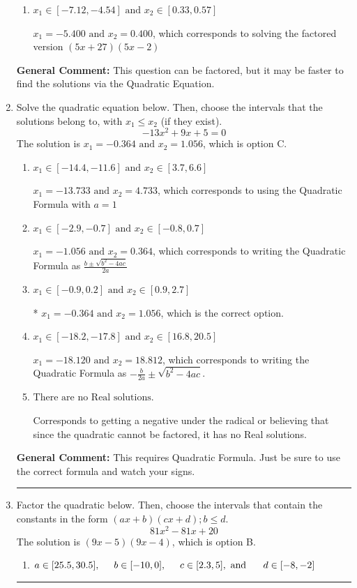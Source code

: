 \documentclass{extbook}[14pt]
\newcommand{\litem}[1]{\item #1

\rule{\textwidth}{0.4pt}}
\begin{document}
\begin{enumerate}
{\begin{enumerate}[label=\Alph*.]
$x_1 = -45.000 \text{ and } x_2 = 30.000$, which corresponds to solving the factored version $(x + 45)(x -30)$
\item \( x_1 \in [-7.12, -4.54] \text{ and } x_2 \in [0.33, 0.57] \)

$x_1 = -5.400 \text{ and } x_2 = 0.400$, which corresponds to solving the factored version $(5x + 27)(5x -2)$
\end{enumerate}

\textbf{General Comment:} This question can be factored, but it may be faster to find the solutions via the Quadratic Equation.
}
\litem{
Solve the quadratic equation below. Then, choose the intervals that the solutions belong to, with $x_1 \leq x_2$ (if they exist).
\[ -13x^{2} +9 x + 5 = 0 \]The solution is \( x_1 = -0.364 \text{ and } x_2 = 1.056 \), which is option C.\begin{enumerate}[label=\Alph*.]
\item \( x_1 \in [-14.4, -11.6] \text{ and } x_2 \in [3.7, 6.6] \)

 $x_1 = -13.733 \text{ and } x_2 = 4.733$, which corresponds to using the Quadratic Formula with $a=1$
\item \( x_1 \in [-2.9, -0.7] \text{ and } x_2 \in [-0.8, 0.7] \)

 $x_1 = -1.056 \text{ and } x_2 = 0.364$, which corresponds to writing the Quadratic Formula as $\frac{b \pm \sqrt{b^2 - 4ac}}{2a}$
\item \( x_1 \in [-0.9, 0.2] \text{ and } x_2 \in [0.9, 2.7] \)

* $x_1 = -0.364 \text{ and } x_2 = 1.056$, which is the correct option.
\item \( x_1 \in [-18.2, -17.8] \text{ and } x_2 \in [16.8, 20.5] \)

 $x_1 = -18.120 \text{ and } x_2 = 18.812$, which corresponds to writing the Quadratic Formula as $-\frac{b}{2a} \pm \sqrt{b^2 - 4ac}$.
\item \( \text{There are no Real solutions.} \)

Corresponds to getting a negative under the radical or believing that since the quadratic cannot be factored, it has no Real solutions.
\end{enumerate}

\textbf{General Comment:} This requires Quadratic Formula. Just be sure to use the correct formula and watch your signs.
}
\litem{
Factor the quadratic below. Then, choose the intervals that contain the constants in the form $(ax+b)(cx+d); b \leq d.$
\[ 81x^{2} -81 x + 20 \]The solution is \( (9x -5)(9x -4) \), which is option B.\begin{enumerate}[label=\Alph*.]
\item \( a \in [25.5, 30.5], \hspace*{5mm} b \in [-10, 0], \hspace*{5mm} c \in [2.3, 5], \text{ and } \hspace*{5mm} d \in [-8, -2] \)


\end{enumerate}}
\end{enumerate}
\end{document}
